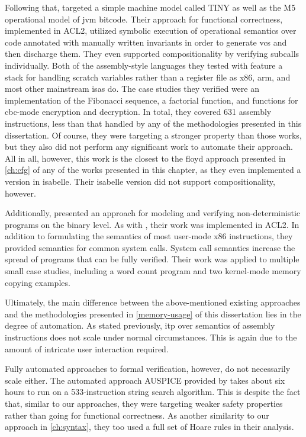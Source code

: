 Following that, \textcite{matthews2006verification}
targeted a simple machine model called TINY
as well as the M5 operational model of \gls{jvm} bitcode.
Their approach for functional correctness, implemented in ACL2,
utilized symbolic execution of operational semantics
over code annotated with manually written invariants
in order to generate \glspl{vc} and then discharge them.
They even supported compositionality by verifying subcalls individually.
Both of the assembly-style languages they tested with feature a stack
for handling scratch variables rather than a register file
as \gls{x86}, \gls{arm}, and most other mainstream \glspl{isa} do.
The case studies they verified were an implementation of the Fibonacci sequence,
a factorial function, and functions for \gls{cbc}-mode encryption and decryption.
In total, they covered \num{631} assembly instructions,
less than that handled by any of the methodologies presented in this dissertation.
Of course, they were targeting a stronger property than those works,
but they also did not perform any significant work to automate their approach.
All in all, however, this work is the closest to the \gls{floyd} approach
presented in \cref{ch:cfg} of any of the works presented in this chapter,
as they even implemented a version in \gls{isabelle}. Their \gls{isabelle} version did not support compositionality, however.

Additionally, \textcite{goel2014syscalls,goelphd} presented an approach for modeling and verifying
non-deterministic programs on the binary level.
As with \textcite{matthews2006verification}, their work was implemented in ACL2.
In addition to formulating the semantics of most user-mode \gls{x86} instructions,
they provided semantics for common system calls.
System call semantics increase the spread of programs that can be fully verified.
Their work was applied to multiple small case studies,
including a word count program and two kernel-mode memory copying examples.

Ultimately, the main difference between the above-mentioned existing approaches
and the methodologies presented in \cref{memory-usage} of this dissertation lies in the degree of automation.
As stated previously, \gls{itp} over semantics of assembly instructions
does not scale under normal circumstances.
This is again due to the amount of intricate user interaction required.

Fully automated approaches to formal verification, however,
do not necessarily scale either.
The automated approach AUSPICE provided by \textcite{tan2015auspice}
takes about six hours to run on a \num{533}-instruction string search algorithm.
This is despite the fact that, similar to our approaches, %
they were targeting weaker safety properties
rather than going for functional correctness.
As another similarity to our approach in \cref{ch:syntax},
they too used a full set of Hoare rules in their analysis.

